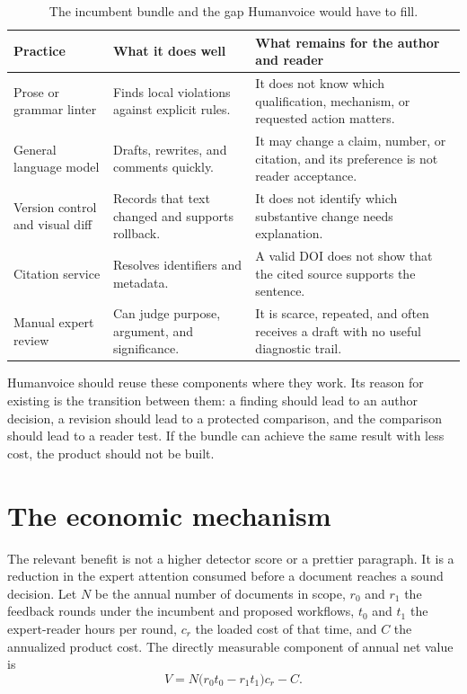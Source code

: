 \begin{table}[H]
\centering
\small
\begin{tabularx}{\textwidth}{@{}p{}LL@{}}
\toprule
Practice & What it does well & What remains for the author and reader \\
\midrule
Prose or grammar linter & Finds local violations against explicit rules. & It
does not know which qualification, mechanism, or requested action matters. \\
General language model & Drafts, rewrites, and comments quickly. & It may
change a claim, number, or citation, and its preference is not reader
acceptance. \\
Version control and visual diff & Records that text changed and supports
rollback. & It does not identify which substantive change needs explanation. \\
Citation service & Resolves identifiers and metadata. & A valid DOI does not
show that the cited source supports the sentence. \\
Manual expert review & Can judge purpose, argument, and significance. & It is
scarce, repeated, and often receives a draft with no useful diagnostic trail. \\
\bottomrule
\end{tabularx}
\caption{The incumbent bundle and the gap Humanvoice would have to fill.}
\label{tab:incumbent-bundle}
\end{table}

Humanvoice should reuse these components where they work. Its reason for
existing is the transition between them: a finding should lead to an author
decision, a revision should lead to a protected comparison, and the comparison
should lead to a reader test. If the bundle can achieve the same result with
less cost, the product should not be built.

\section{The economic mechanism}

The relevant benefit is not a higher detector score or a prettier paragraph.
It is a reduction in the expert attention consumed before a document reaches a
sound decision. Let $N$ be the annual number of documents in scope, $r_0$ and
$r_1$ the feedback rounds under the incumbent and proposed workflows, $t_0$
and $t_1$ the expert-reader hours per round, $c_r$ the loaded cost of that
time, and $C$ the annualized product cost. The directly measurable component of
annual net value is
\begin{equation}
  V = N\bigl(r_0t_0-r_1t_1\bigr)c_r-C.
  \label{eq:value}
\end{equation}

